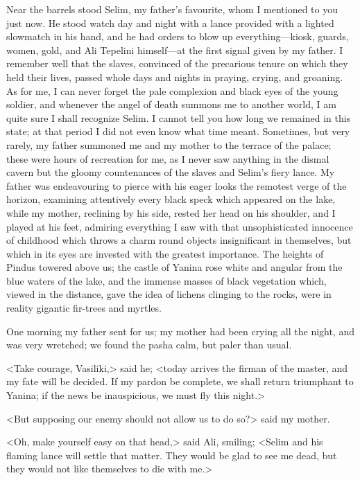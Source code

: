 Near the barrels stood Selim, my father's favourite, whom I mentioned to you just now. He stood watch day and night with a lance provided with a lighted slowmatch in his hand, and he had orders to blow up everything—kiosk, guards, women, gold, and Ali Tepelini himself—at the first signal given by my father. I remember well that the slaves, convinced of the precarious tenure on which they held their lives, passed whole days and nights in praying, crying, and groaning. As for me, I can never forget the pale complexion and black eyes of the young soldier, and whenever the angel of death summons me to another world, I am quite sure I shall recognize Selim. I cannot tell you how long we remained in this state; at that period I did not even know what time meant. Sometimes, but very rarely, my father summoned me and my mother to the terrace of the palace; these were hours of recreation for me, as I never saw anything in the dismal cavern but the gloomy countenances of the slaves and Selim's fiery lance. My father was endeavouring to pierce with his eager looks the remotest verge of the horizon, examining attentively every black speck which appeared on the lake, while my mother, reclining by his side, rested her head on his shoulder, and I played at his feet, admiring everything I saw with that unsophisticated innocence of childhood which throws a charm round objects insignificant in themselves, but which in its eyes are invested with the greatest importance. The heights of Pindus towered above us; the castle of Yanina rose white and angular from the blue waters of the lake, and the immense masses of black vegetation which, viewed in the distance, gave the idea of lichens clinging to the rocks, were in reality gigantic fir-trees and myrtles. 

One morning my father sent for us; my mother had been crying all the night, and was very wretched; we found the pasha calm, but paler than usual. 

<Take courage, Vasiliki,> said he; <today arrives the firman of the master, and my fate will be decided. If my pardon be complete, we shall return triumphant to Yanina; if the news be inauspicious, we must fly this night.>

<But supposing our enemy should not allow us to do so?> said my mother. 

<Oh, make yourself easy on that head,> said Ali, smiling; <Selim and his flaming lance will settle that matter. They would be glad to see me dead, but they would not like themselves to die with me.> 

